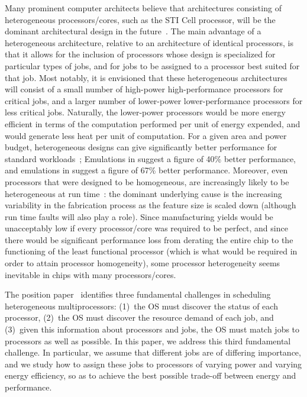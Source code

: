 \documentclass[11pt]{article}
\begin{document}
Many prominent computer architects believe that architectures consisting
of heterogeneous processors/cores, such as the STI Cell processor, will
be the dominant architectural design in the
future~\cite{Bower2008,Kumar2004,Kumar2006,Merritt2008,Tomer2006}.  The
main advantage of a heterogeneous architecture, relative to an
architecture of identical processors, is that it allows for the
inclusion of processors whose design is specialized for particular types
of jobs, and for jobs to be assigned to a processor best suited for
that job.  Most notably, it is envisioned that these heterogeneous
architectures will consist of a small number of high-power
high-performance processors for critical jobs, and a larger number of
lower-power lower-performance processors for less critical jobs.
Naturally, the lower-power processors would be more energy efficient in
terms of the computation performed per unit of energy expended, and
would generate less heat per unit of computation.  For a given area and
power budget, heterogeneous designs can give significantly better
performance for standard workloads~\cite{Bower2008,Merritt2008};
Emulations in \cite{Kumar2006} suggest a figure of 40\% better
performance, and emulations in \cite{Tomer2006} suggest a figure of
67\% better performance.
Moreover, even processors that were designed to be homogeneous, are
increasingly likely to be heterogeneous at run time~\cite{Bower2008}:
the dominant underlying cause is the increasing variability in the
fabrication process as the feature size is scaled down (although run
time faults will also play a role).  Since manufacturing yields would be
unacceptably low if every processor/core was required to be perfect, and
since there would be significant performance loss from derating the
entire chip to the functioning of the least functional processor (which
is what would be required in order to attain processor homogeneity),
some processor heterogeneity seems inevitable in chips with many processors/cores.

The position paper~\cite{Bower2008} identifies three fundamental
challenges in scheduling heterogeneous multiprocessors: (1)~the OS must
discover the status of each processor, (2)~the OS must discover the
resource demand of each job, and (3)~given this information about
processors and jobs, the OS must match jobs to processors as well as
possible. In this paper, we address this third fundamental challenge.
In particular, we assume that different jobs are of differing
importance, and we study how to assign these jobs to processors of
varying power and varying energy efficiency, so as to achieve the best
possible trade-off between energy and performance.
\end{document}
